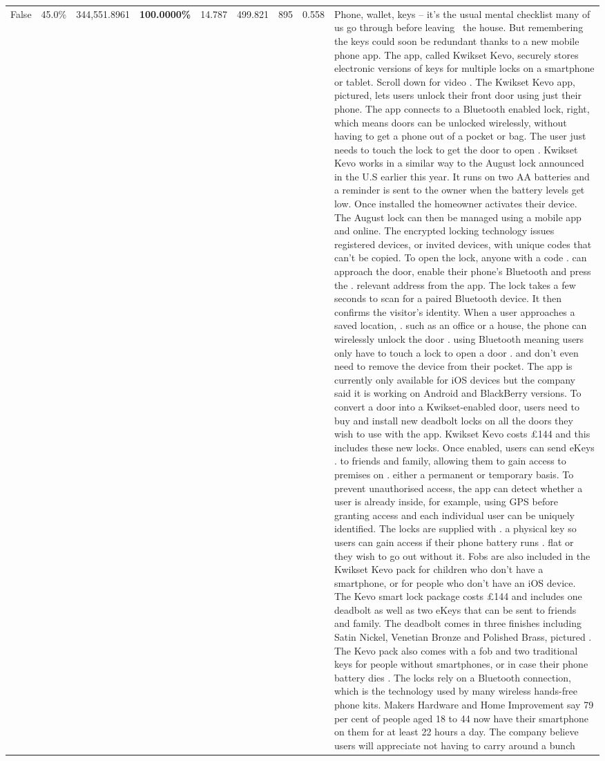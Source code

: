 \begin{table}[H]
\begin{tabular}{lllrlllll}
False & 45.0\% & 344,551.8961 & \bfseries \color{red} 100.0000\% & 14.787 & 499.821 & 895 & 0.558 & Phone, wallet, keys – it’s the usual mental checklist many of us go through before leaving  the house. But remembering the keys could soon be redundant thanks to a new mobile phone app. The app, called Kwikset Kevo, securely stores electronic versions of keys for multiple locks on a smartphone or tablet. Scroll down for video . The Kwikset Kevo app, pictured, lets users unlock their front door using just their phone. The app connects to a Bluetooth enabled lock, right, which means doors can be unlocked wirelessly, without having to get a phone out of a pocket or bag. The user just needs to touch the lock to get the door to open . Kwikset Kevo works in a similar way to the August lock announced in the U.S earlier this year. It runs on two AA batteries and a reminder is sent to the owner when the battery levels get low. Once installed the homeowner activates their device. The August lock can then be managed using a mobile app and online. The encrypted locking technology issues registered devices, or invited devices, with unique codes that can't be copied. To open the lock, anyone with a code . can approach the door, enable their phone's Bluetooth and press the . relevant address from the app. The lock takes a few seconds to scan for a paired Bluetooth device. It then confirms the visitor's identity. When a user approaches a saved location, . such as an office or a house, the phone can wirelessly unlock the door . using Bluetooth meaning users only have to touch a lock to open a door . and don't even need to remove the device from their pocket. The app is currently only available for iOS devices but the company said it is working on Android and BlackBerry versions. To convert a door into a Kwikset-enabled door, users need to buy and install new deadbolt locks on all the doors they wish to use with the app. Kwikset Kevo costs £144 and this includes these new locks. Once enabled, users can send eKeys . to friends and family, allowing them to gain access to premises on . either a permanent or temporary basis. To prevent unauthorised access, the app can detect whether a user is already inside, for example, using GPS before granting access and each individual user can be uniquely identified. The locks are supplied with . a physical key so users can gain access if their phone battery runs . flat or they wish to go out without it. Fobs are also included in the Kwikset Kevo pack for children who don't have a smartphone, or for people who don't have an iOS device. The Kevo smart lock package costs £144 and includes one deadbolt as well as two eKeys that can be sent to friends and family. The deadbolt comes in three finishes including Satin Nickel, Venetian Bronze and Polished Brass, pictured . The Kevo pack also comes with a fob and two traditional keys for people without smartphones, or in case their phone battery dies . The locks rely on a Bluetooth connection, which is the technology used by many wireless hands-free phone kits. Makers Hardware and Home Improvement say 79 per cent of people aged 18 to 44 now have their smartphone on them for at least 22 hours a day. The company believe users will appreciate not having to carry around a bunch 
\end{tabular}
\end{table}
